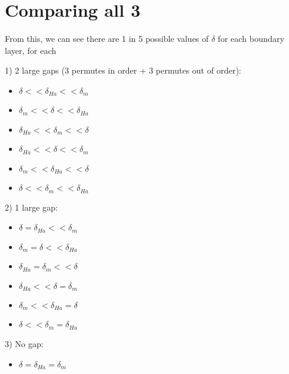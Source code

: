 \documentclass[11pt]{article}
\begin{document}
\section{Comparing all 3}

From this, we can see there are 1 in 5 possible values of $\delta$ for each boundary layer, for each

1) 2 large gaps (3 permutes in order + 3 permutes out of order):
\begin{itemize}
\setlength\itemsep{-1em}
	\item $\delta      <<    \delta_{Ha}   <<   \delta_m      $
	\item $\delta_m    <<    \delta        <<   \delta_{Ha}   $
	\item $\delta_{Ha} <<    \delta_m      <<   \delta        $
	\item $\delta_{Ha} <<    \delta        <<   \delta_m      $
	\item $\delta_m    <<    \delta_{Ha}   <<   \delta        $
	\item $\delta      <<    \delta_m      <<   \delta_{Ha}   $
\end{itemize}

2) 1 large gap:
\begin{itemize}
\setlength\itemsep{-1em}
	\item $\delta      =     \delta_{Ha}   <<   \delta_m      $
	\item $\delta_m    =     \delta        <<   \delta_{Ha}   $
	\item $\delta_{Ha} =     \delta_m      <<   \delta        $
	\item $\delta_{Ha} <<    \delta        =    \delta_m      $
	\item $\delta_m    <<    \delta_{Ha}   =    \delta        $
	\item $\delta      <<    \delta_m      =    \delta_{Ha}   $
\end{itemize}

3) No gap:
\begin{itemize}
\setlength\itemsep{-1em}
	\item $\delta      =     \delta_{Ha}   =    \delta_m      $
\end{itemize}
\end{document}
